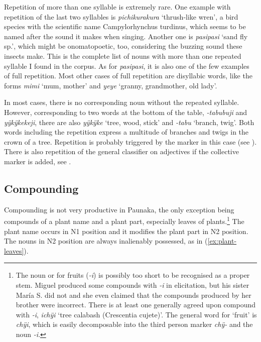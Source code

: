 Repetition of more than one syllable is extremely rare. One example with repetition of the last two syllables is \textit{pichikurakura} ‘thrush-like wren’, a bird species with the scientific name Cam\-py\-lo\-rhyn\-chus turdinus, which seems to be named after the sound it makes when singing. Another one is \textit{pasipasi} ‘sand fly sp.’, which might be onomatopoetic, too, considering the buzzing sound these insects make. This is the complete list of nouns with more than one repeated syllable I found in the corpus. As for \textit{pasipasi}, it is also one of the few examples of full repetition. Most other cases of full repetition are disyllabic words, like the  forms \textit{mimi} ‘mum, mother’ and \textit{yeye} ‘granny, grandmother, old lady’.

\largerpage
In most cases, there is no corresponding noun without the repeated syllable. However, corresponding to two words at the bottom of the table, \textit{-tabubuji} and \textit{yÿkÿkekeji}, there are also \textit{yÿkÿke} ‘tree, wood, stick’ and \textit{-tabu} ‘branch, twig’. Both words including the repetition express a multitude of branches and twigs in the crown of a tree. Repetition is probably triggered by the  marker in this case (see ). There is also repetition of the general classifier on adjectives if the collective marker is added, see .


\subsection{Compounding}\label{sec:Compounding}
\largerpage
Compounding is not very productive in Paunaka, the only exception being compounds of a plant name and a plant part, especially leaves of plants.\footnote{The noun or  for fruits (\textit{-i}) is possibly too short to be recognised as a proper stem. Miguel produced some compounds with \textit{-i} in elicitation, but his sister María S. did not and she even claimed that the compounds produced by her brother were incorrect. There is at least one generally agreed upon compound with \textit{-i}, \textit{ichÿi} ‘tree calabash (Crescentia cujete)’. The general word for ‘fruit’ is \textit{chÿi}, which is easily decomposable into the third person marker \textit{chÿ-} and the noun \textit{-i}.} The plant name occurs in N1 position and it modifies the plant part in N2 position. The nouns in N2 position are always inalienably possessed, as in (\ref{ex:plant-leaves}).

